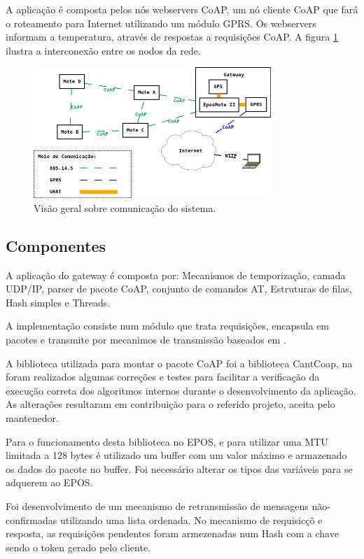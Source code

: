 A aplica\c{c}\~ao \'e composta pelos n\'os webservers CoAP, um n\'o cliente CoAP que far\'a o roteamento para Internet utilizando um m\'odulo GPRS.  Os webservers informam a temperatura, atrav\'es de respostas a requisi\c{c}\~oes CoAP. A figura \ref{arquitetura} ilustra a interconex\~ao entre os nodos da rede.

\begin{figure}[H]
   \label{arquitetura}
   \centering
   \includegraphics[width=0.8\textwidth]{figuras/arquitetura.png}
   \caption{Vis\~ao geral sobre comunica\c{c}\~ao do sistema.}
\end{figure}

\subsection{Componentes}
A aplica\c{c}\~ao do gateway \'e composta por: Mecanismos de temporiza\c{c}\~ao, camada UDP/IP, parser de pacote CoAP, conjunto de comandos AT, Estruturas de filas, Hash simples e Threads.

A implementa\c{c}\~ao consiste num m\'odulo que trata requisi\c{c}\~oes, encapsula em pacotes e transmite por mecanimos de transmiss\~ao baseados em \cite{draft-ietf-core-coap-18}.

A biblioteca utilizada para montar o pacote CoAP foi a biblioteca CantCoap, na foram realizados algumas corre\c{c}\~oes e testes para facilitar a verifica\c{c}\~ao da execu\c{c}\~ao correta dos algoritmos internos durante o desenvolvimento da aplica\c{c}\~ao. As altera\c{c}\~oes resultaram em contribui\c{c}\~ao para o referido projeto, aceita pelo mantenedor.

Para o funcionamento desta biblioteca no EPOS, e para utilizar uma MTU limitada a 128 bytes \'e utilizado um buffer com um valor m\'aximo e armazenado os dados do pacote no buffer. Foi necess\'ario alterar os tipos das vari\'aveis para se adquerem ao EPOS.

Foi desenvolvimento de um mecanismo de retransmiss\~ao de mensagens n\~ao-confirmadas utilizando uma lista ordenada. No mecanismo de requisic\c{c}\~o e resposta, as requisi\c{c}\~oes pendentes foram armezenadas num Hash com a chave sendo o token gerado pelo cliente.

